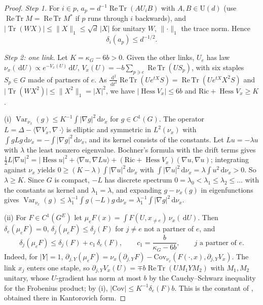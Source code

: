\documentclass[11pt,a4paper]{amsart}
\theoremstyle{definition}
\theoremstyle{remark}
\numberwithin{equation}{section}
\DeclareMathOperator{\Tr}{Tr}        %
\DeclareMathOperator{\ReTr}{Re\,Tr}  %
\DeclareMathOperator{\Var}{Var}      %
\DeclareMathOperator{\Hess}{Hess}    %
\newcommand{\ip}[2]{\langle #1,#2\rangle}  %
\newcommand{\norm}[1]{\lVert #1\rVert}     %
\newcommand{\abs}[1]{\lvert #1\rvert}      %
\newcommand{\dd}{\,\mathrm{d}}             %
\newcommand{\U}{\mathrm{U}}                %
\begin{document}
\begin{proof}
\emph{Step 1.} For $i\in p$, $a_p=d^{-1}\ReTr(AU_iB)$ with $A,B\in\U(d)$ (use $\ReTr M=\ReTr M^*$ if $p$ runs through $i$ backwards), and $\abs{\Tr(WX)}\le\norm{X}_1\le\sqrt d\,\abs X$ for unitary $W$, $\norm{\cdot}_1$ the trace norm. Hence
\begin{equation}\label{eq:ln-grad}
\delta_i(a_p)\le d^{-1/2}.
\end{equation}

\emph{Step 2: one link.} Let $K=\kappa_G-6b>0$. Given the other links, $U_e$ has law $\nu_x(\dd U)\propto e^{-V_x(U)}\dd U$, $V_x(U)=-b\sum_{p\ni e}\ReTr(US_p)$, with six staples $S_p\in G$ made of partners of $e$. As $\frac{\dd^2}{\dd t^2}\ReTr(Ue^{tX}S)=\ReTr(Ue^{tX}X^2S)$ and $\abs{\Tr(WX^2)}\le\norm{X^2}_1=\abs{X}^2$, we have $\abs{\Hess V_x}\le6b$ and $\mathrm{Ric}+\Hess V_x\ge K$.

(i) $\Var_{\nu_x}(g)\le K^{-1}\int\abs{\nabla g}^2\dd\nu_x$ for $g\in C^1(G)$. The operator $L=\Delta-\ip{\nabla V_x}{\nabla\,\cdot}$ is elliptic and symmetric in $L^2(\nu_x)$ with $\int gLg\dd\nu_x=-\int\abs{\nabla g}^2\dd\nu_x$, and its kernel consists of the constants. Let $Lu=-\lambda u$ with $\lambda$ the least nonzero eigenvalue. Bochner's formula with the drift terms gives $\frac12L\abs{\nabla u}^2=\abs{\Hess u}^2+\ip{\nabla u}{\nabla Lu}+(\mathrm{Ric}+\Hess V_x)(\nabla u,\nabla u)$; integrating against $\nu_x$ yields $0\ge(K-\lambda)\int\abs{\nabla u}^2\dd\nu_x$ with $\int\abs{\nabla u}^2\dd\nu_x=\lambda\int u^2\dd\nu_x>0$. So $\lambda\ge K$. Since $G$ is compact, $-L$ has discrete spectrum $0=\lambda_0<\lambda_1\le\lambda_2\le\dots$ with the constants as kernel and $\lambda_1=\lambda$, and expanding $g-\nu_x(g)$ in eigenfunctions gives $\Var_{\nu_x}(g)\le\lambda_1^{-1}\int g(-L)g\dd\nu_x=\lambda_1^{-1}\int\abs{\nabla g}^2\dd\nu_x$.

(ii) For $F\in C^1(G^E)$ let $\mu_eF(x)=\int F(U,x_{\neq e})\,\nu_x(\dd U)$. Then $\delta_e(\mu_eF)=0$, $\delta_j(\mu_eF)\le\delta_j(F)$ for $j\neq e$ not a partner of $e$, and
\begin{equation}\label{eq:ln-oneLink}
\delta_j(\mu_eF)\le\delta_j(F)+c_1\,\delta_e(F),\qquad c_1=\frac{b}{\kappa_G-6b},\qquad j\text{ a partner of }e.
\end{equation}
Indeed, for $\abs Y=1$, $\partial_{j,Y}(\mu_eF)=\nu_x(\partial_{j,Y}F)-\mathrm{Cov}_{\nu_x}(F(\cdot,x),\partial_{j,Y}V_x)$. The link $x_j$ enters one staple, so $\partial_{j,Y}V_x(U)=\mp b\ReTr(UM_1YM_2)$ with $M_1,M_2$ unitary, whose $U$-gradient has norm at most $b$ by the Cauchy--Schwarz inequality for the Frobenius product; by (i), $\abs{\mathrm{Cov}}\le K^{-1}\delta_e(F)b$. This is the constant of \cite[Lemma~34(ii)]{bhattacharjee2026first}, obtained there in Kantorovich form.


\end{proof}
\end{document}
